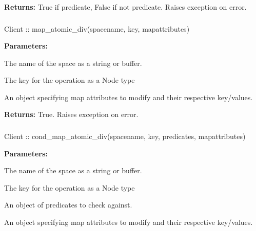 \noindent\textbf{Returns:}
True if predicate, False if not predicate.  Raises exception on error.

\subsubsection{}
\label{api:nodejs:map_atomic_div}
\begin{javascriptcode}
Client :: map_atomic_div(spacename, key, mapattributes)
\end{javascriptcode}


\noindent\textbf{Parameters:}
\begin{description}[labelindent=\widthof{{\code{mapattributes}}},leftmargin=*,noitemsep,nolistsep,align=right]
\item[\code{spacename}] The name of the space as a string or buffer.
\item[\code{key}] The key for the operation as a Node type
\item[\code{mapattributes}] An object specifying map attributes to modify and their respective key/values.
\end{description}

\noindent\textbf{Returns:}
True.  Raises exception on error.

\subsubsection{}
\label{api:nodejs:cond_map_atomic_div}
\begin{javascriptcode}
Client :: cond_map_atomic_div(spacename, key, predicates, mapattributes)
\end{javascriptcode}


\noindent\textbf{Parameters:}
\begin{description}[labelindent=\widthof{{\code{mapattributes}}},leftmargin=*,noitemsep,nolistsep,align=right]
\item[\code{spacename}] The name of the space as a string or buffer.
\item[\code{key}] The key for the operation as a Node type
\item[\code{predicates}] An object of predicates to check against.
\item[\code{mapattributes}] An object specifying map attributes to modify and their respective key/values.
\end{description}

